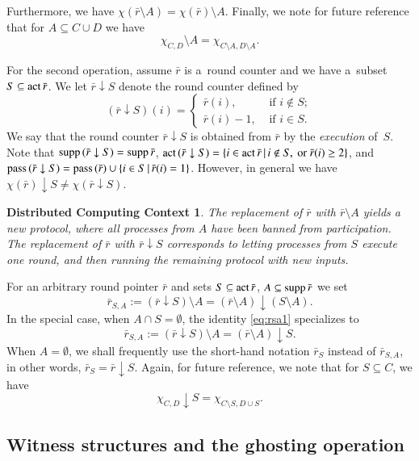 \documentclass{amsart}[10pt]
\newtheorem{dcc}[theorem]{Distributed Computing Context}
\newcommand{\act}{\text{\rm act}\,}
\newcommand{\dar}{\downarrow}
\newcommand{\es}{\emptyset}
\newcommand{\pass}{\text{\rm pass}\,}
\newcommand{\pnt}{round counter }
\newcommand{\sm}{\setminus}
\newcommand{\supp}{\text{\rm supp}\,}
\newcommand{\tr}{{\bar r}}
\numberwithin{equation}{section}
\numberwithin{figure}{section}
\numberwithin{table}{section}
\begin{document}
Furthermore, we have $\chi(\tr\sm
A)=\chi(\tr)\sm A$. Finally, we note for future reference that for
$A\subseteq C\cup D$ we have
\begin{equation}\label{eq:chi2}
\chi_{C,D}\sm A=\chi_{C\sm A,D\sm A}.
\end{equation} 

For the second operation, assume $\tr$ is a~\pnt and we have a~subset
$S\subseteq\act\tr$. We let $\tr\dar S$ denote the \pnt defined by
\[(\tr\dar S)(i)=\begin{cases}
\tr(i), & \text{ if } i\notin S;\\
\tr(i)-1,   & \text{ if } i\in S.
\end{cases}\]
We say that the \pnt $\tr\dar S$ is obtained from $\tr$ by the {\it
  execution} of~$S$. Note that $\supp(\tr\dar S)=\supp\tr$,
$\act(\tr\dar S)=\{i\in\act\tr\,|\, i\notin S, \textrm{ or }\tr(i)\geq
2 \}$, and $\pass(\tr\dar S)=\pass(\tr)\cup\{i\in S\,|\,\tr(i)=1\}$.
However, in general we have $\chi(\tr)\dar S\neq\chi(\tr\dar S)$.

\begin{dcc} 
The replacement of $\tr$ with $\tr\sm A$ yields a new protocol, where
all processes from $A$ have been banned from participation. The
replacement of $\tr$ with $\tr\dar S$ corresponds to letting processes
from $S$ execute one round, and then running the remaining protocol
with new inputs.
\end{dcc}

For an arbitrary round pointer $\tr$ and sets $S\subseteq\act\tr$,
$A\subseteq\supp\tr$ we set
\begin{equation}\label{eq:rsa1}
\tr_{S,A}:=(\tr\dar S)\sm A=(\tr\sm A)\dar(S\sm A).
\end{equation}
In the special case, when $A\cap S=\es$, the identity \eqref{eq:rsa1}
specializes to
\begin{equation}\label{eq:rsa2}
\tr_{S,A}:=(\tr\dar S)\sm A=(\tr\sm A)\dar S.
\end{equation}
When $A=\es$, we shall frequently use the short-hand notation $\tr_S$
instead of $\tr_{S,A}$, in other words, $\tr_S=\tr\dar S$. 
Again, for future reference, we note that for $S\subseteq C$, we have
\begin{equation}\label{eq:chi3}
\chi_{C,D}\dar S=\chi_{C\sm S,D\cup S}.
\end{equation}


\subsection{Witness structures and the ghosting operation} $\,$
\end{document}
